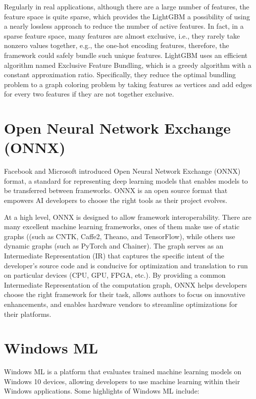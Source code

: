 Regularly in real applications, although there are a large number of features, the feature space is quite sparse, which provides the LightGBM a possibility of using a nearly lossless approach to reduce the number of active features.
In fact, in a sparse feature space, many features are almost exclusive, i.e., they rarely take nonzero values together, e.g., the one-hot encoding features, therefore, the framework could safely bundle such unique features.
LightGBM uses an efficient algorithm named Exclusive Feature Bundling, which is a greedy algorithm with a constant approximation ratio.
Specifically, they reduce the optimal bundling problem to a graph coloring problem by taking features as vertices and add edges for every two features if they are not together exclusive.

\section{Open Neural Network Exchange (ONNX)}
\label{sec:onnx}
 
Facebook and Microsoft introduced Open Neural Network Exchange (ONNX) format, a standard for representing deep learning models that enables models to be transferred between frameworks. 
ONNX is an open source format that empowers AI developers to choose the right tools as their project evolves.
 
At a high level, ONNX is designed to allow framework interoperability. There are many excellent machine learning frameworks, ones of them make use of static graphs ((such as CNTK, Caffe2, Theano, and TensorFlow), while others use dynamic graphs (such as PyTorch and Chainer).
The graph serves as an Intermediate Representation (IR) that captures the specific intent of the developer's source code and is conducive for optimization and translation to run on particular devices (CPU, GPU, FPGA, etc.).
By providing a common Intermediate Representation of the computation graph, ONNX helps developers choose the right framework for their task, allows authors to focus on innovative enhancements, and enables hardware vendors to streamline optimizations for their platforms.
 
\section{Windows ML}
 
Windows ML is a platform that evaluates trained machine learning models on Windows 10 devices, allowing developers to use machine learning within their Windows applications. 
Some highlights of Windows ML include:
 
